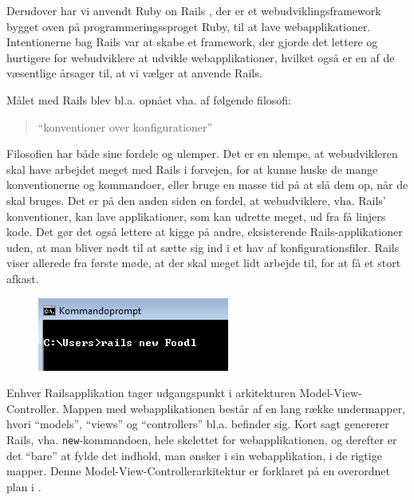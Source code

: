 Derudover har vi anvendt Ruby on Rails \cite{rubyonrailswiki}, der er et webudviklingsframework bygget oven på programmeringssproget Ruby, til at lave webapplikationer. Intentionerne bag Rails var at skabe et framework, der gjorde det lettere og hurtigere for webudviklere at udvikle webapplikationer, hvilket også er en af de væsentlige årsager til, at vi vælger at anvende Rails. 

Målet med Rails blev bl.a. opnået vha. af følgende filosofi:
\begin{quote}
``konventioner over konfigurationer''
\end{quote} 

Filosofien har både sine fordele og ulemper. Det er en ulempe, at webudvikleren skal have arbejdet meget med Rails i forvejen, for at kunne huske de mange konventionerne og kommandoer, eller bruge en masse tid på at slå dem op, når de skal bruges. Det er på den anden siden en fordel, at webudviklere, vha. Rails' konventioner, kan lave applikationer, som kan udrette meget, ud fra få linjers kode. Det gør det også lettere at kigge på andre, eksisterende Rails-applikationer uden, at man bliver nødt til at sætte sig ind i et hav af konfigurationsfiler. Rails viser allerede fra første møde, at der skal meget lidt arbejde til, for at få et stort afkast. 

\begin{figure}
	\centering
	\includegraphics[scale=0.6]{billeder/Rails-new-foodl.png}
	\label{fig:Rails-new-foodl}
\end{figure}

Enhver Railsapplikation tager udgangspunkt i arkitekturen Model-View-Controller. Mappen med webapplikationen består af en lang række undermapper, hvori ``models'', ``views'' og ``controllers'' bl.a. befinder sig. Kort sagt genererer Rails, vha. \texttt{new}-kommandoen, hele skelettet for webapplikationen, og derefter er det ``bare'' at fylde det indhold, man ønsker i sin webapplikation, i de rigtige mapper. Denne Model-View-Controllerarkitektur er forklaret på en overordnet plan i .
